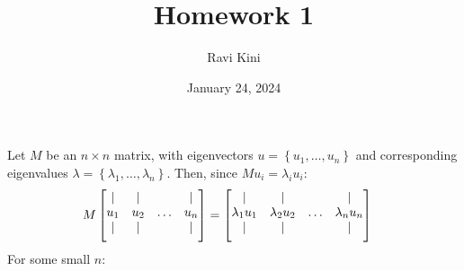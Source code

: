 \documentclass{article}
\title{Homework 1}
\author{Ravi Kini}
\date{January 24, 2024}
\begin{document}
\maketitle

\problem
{}
Let $M$ be an $n \times n$ matrix, with eigenvectors $u = \left\{u_1, \ldots, u_n\right\}$ and corresponding eigenvalues $\lambda = \left\{\lambda_1, \ldots, \lambda_n\right\}$. Then, since $Mu_i = \lambda_iu_i$:
\begin{equation}
    \begin{split}
        M\begin{bmatrix}\vert & \vert &  & \vert \\u_1 &  u_2 & \hdots &  u_n\\\vspace{.15 cm}\vert & \vert &  & \vert\end{bmatrix} & = \begin{bmatrix}\vert & \vert &  & \vert \\\lambda_1u_1 &  \lambda_2u_2 & \hdots &  \lambda_nu_n\\\vspace{.15 cm}\vert & \vert &  & \vert\end{bmatrix}
    \end{split}
\end{equation}
For some small $n$:
\end{document}
